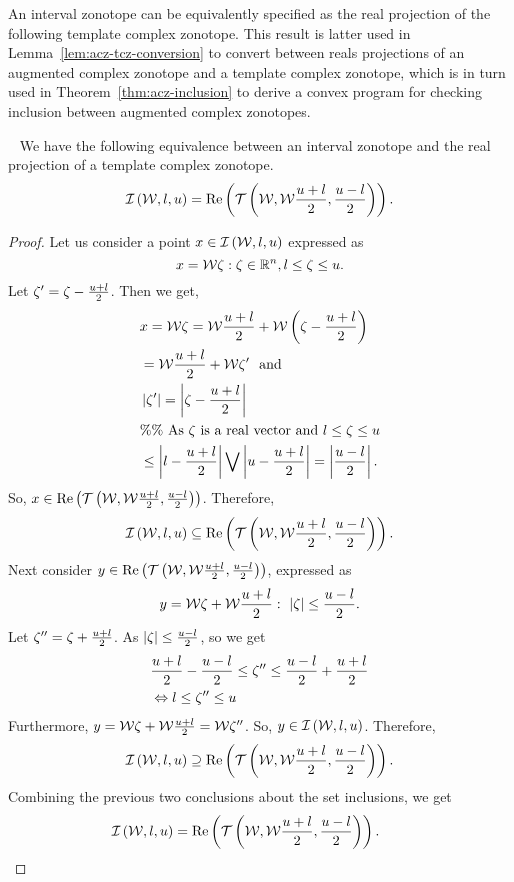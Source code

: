 %
An interval zonotope can be equivalently specified as the real
projection of the following template complex zonotope.  This result is
latter used in Lemma~\ref{lem:acz-tcz-conversion} to convert between
reals projections of an augmented complex zonotope and a template
complex zonotope, which is in turn used in
Theorem~\ref{thm:acz-inclusion} to derive a convex program for checking
inclusion between augmented complex zonotopes.
%
\begin{lemma}~\label{lem:iz-tcz-conversion}
We have the following equivalence between an interval zonotope and the
real projection of a template complex zonotope.
%
\[
\mathit{\operatorname{\mathcal{I}}}\left(\mathcal{W},l,u\right)=\operatorname{Re}\left(\mathit{\operatorname{\mathcal{T}}}\left(\mathcal{W},\mathcal{W}\frac{u+l}{2},\frac{u-l}{2}\right)\right).
\]
%
\end{lemma}
%
\begin{proof}
Let us consider a point $x\in\mathit{\operatorname{\mathcal{I}}}\left(\mathcal{W},l,u\right)$ expressed as
%
\[
x=\mathcal{W}\zeta:\zeta\in\mathbb{R}^n,l\leq\zeta\leq u.
\]
%
  Let $\zeta^\prime=
\zeta-\frac{u+l}{2}$.
Then we get,
%
\begin{align*}
& x=\mathcal{W}\zeta=\mathcal{W}\frac{u+l}{2}+\mathcal{W}\left(\zeta-\frac{u+l}{2}\right)\\
& = \mathcal{W}\frac{u+l}{2}+\mathcal{W}\zeta^\prime~~\text{and}\\
& \left|\zeta^\prime\right|=\left|\zeta-\frac{u+l}{2}\right|\\
& \%\%~\text{As $\zeta$ is a real vector and $l\leq\zeta\leq u$}\\
& \leq \left|l-\frac{u+l}{2}\right|\bigvee \left|u-\frac{u+l}{2}\right|
= \left|\frac{u-l}{2}\right|.
\end{align*}
%
So,
$x\in\operatorname{Re}\left(\mathit{\operatorname{\mathcal{T}}}\left(\mathcal{W},\mathcal{W}\frac{u+l}{2},\frac{u-l}{2}\right)\right)$.  Therefore,
%
\[
\mathit{\operatorname{\mathcal{I}}}\left(\mathcal{W},l,u\right)\subseteq\operatorname{Re}\left(\mathit{\operatorname{\mathcal{T}}}\left(\mathcal{W},\mathcal{W}\frac{u+l}{2},\frac{u-l}{2}\right)\right).
\]
%
Next consider $y\in\operatorname{Re}\left(\mathit{\operatorname{\mathcal{T}}}\left(\mathcal{W},\mathcal{W}\frac{u+l}{2},\frac{u-l}{2}\right)\right)$,
expressed as
\[
y=\mathcal{W}\zeta+\mathcal{W}\frac{u+l}{2}:~\left|\zeta\right|\leq\frac{u-l}{2}.
\]
%
Let $\zeta^{\prime\prime}=\zeta+\frac{u+l}{2}$.
As
$\left|\zeta\right|\leq\frac{u-l}{2}$, so we get
%
\begin{align*}
&
\frac{u+l}{2}-\frac{u-l}{2}\leq\zeta^{\prime\prime}\leq\frac{u-l}{2}+\frac{u+l}{2}\\
& \Leftrightarrow l\leq\zeta^{\prime\prime}\leq u
\end{align*}
%
Furthermore, $y=\mathcal{W}\zeta+\mathcal{W}\frac{u+l}{2}=\mathcal{W}\zeta^{\prime\prime}$.
So, $y\in\mathit{\operatorname{\mathcal{I}}}\left(\mathcal{W},l,u\right)$.  Therefore,
%
\[
\mathit{\operatorname{\mathcal{I}}}\left(\mathcal{W},l,u\right)\supseteq\operatorname{Re}\left(\mathit{\operatorname{\mathcal{T}}}\left(\mathcal{W},\mathcal{W}\frac{u+l}{2},\frac{u-l}{2}\right)\right).
\]
%
Combining the previous two conclusions about the set inclusions, we get
%
\[
\mathit{\operatorname{\mathcal{I}}}\left(\mathcal{W},l,u\right)=\operatorname{Re}\left(\mathit{\operatorname{\mathcal{T}}}\left(\mathcal{W},\mathcal{W}\frac{u+l}{2},\frac{u-l}{2}\right)\right).~~~~~~\qedhere
\]
%
\end{proof}
